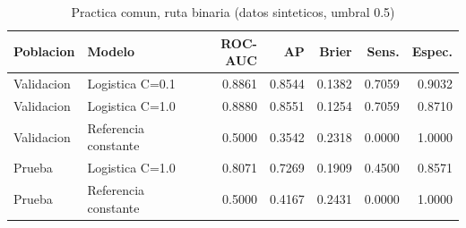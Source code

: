 \begin{table}[H]
\centering
\small
\caption{Practica comun, ruta binaria (datos sinteticos, umbral 0.5)}
\begin{tabular}{llrrrrr}
\toprule
\textbf{Poblacion} & \textbf{Modelo} & \textbf{ROC-AUC} & \textbf{AP} & \textbf{Brier} & \textbf{Sens.} & \textbf{Espec.} \\
\midrule
Validacion & Logistica C=0.1 & 0.8861 & 0.8544 & 0.1382 & 0.7059 & 0.9032 \\
Validacion & Logistica C=1.0 & 0.8880 & 0.8551 & 0.1254 & 0.7059 & 0.8710 \\
Validacion & Referencia constante & 0.5000 & 0.3542 & 0.2318 & 0.0000 & 1.0000 \\
Prueba & Logistica C=1.0 & 0.8071 & 0.7269 & 0.1909 & 0.4500 & 0.8571 \\
Prueba & Referencia constante & 0.5000 & 0.4167 & 0.2431 & 0.0000 & 1.0000 \\
\bottomrule
\end{tabular}
\end{table}
